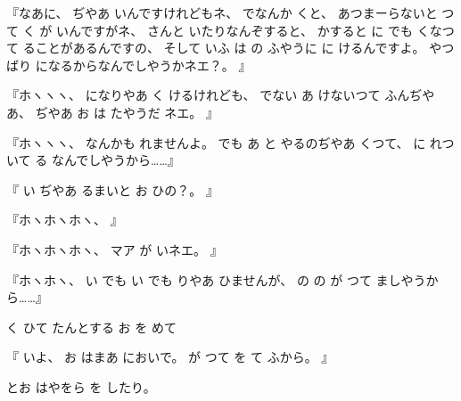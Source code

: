 %
『なあに、
%
ぢやあ
いんですけれどもネ、
%
でなんか
くと、
%
あつまーらないと
つて
く
が
いんですがネ、
%
さんと
いたりなんぞすると、
%
かすると
に
でも
くなつて
ることがあるんですの、
%
そして
いふ
は
の
ふやうに
に
けるんですよ。
%
やつばり
になるからなんでしやうかネエ？。
』

%
『ホヽヽヽ、
%
になりやあ
く
けるけれども、
%
でない
あ
けないつて
ふんぢやあ、
%
ぢやあ
お
は
たやうだ
ネエ。
』

%
『ホヽヽヽ、
%
なんかも
れませんよ。
%
でも
あ
と
やるのぢやあ
くつて、
%
に
れついて
る
なんでしやうから……』

%
『
い
ぢやあ
るまいと
お
ひの？。
』

%
『ホヽホヽホヽ、
』

%
『ホヽホヽホヽ、
%
マア
が
いネエ。
』

%
『ホヽホヽ、
%
い
でも
い
でも
りやあ
ひませんが、
%
の
の
が
つて
ましやうから……』

%
く
ひて
たんとする
お
を
めて

%
『
いよ、
%
お
はまあ
においで。
%
が
つて
を
て
ふから。
』

%
とお
はやをら
を
したり。
